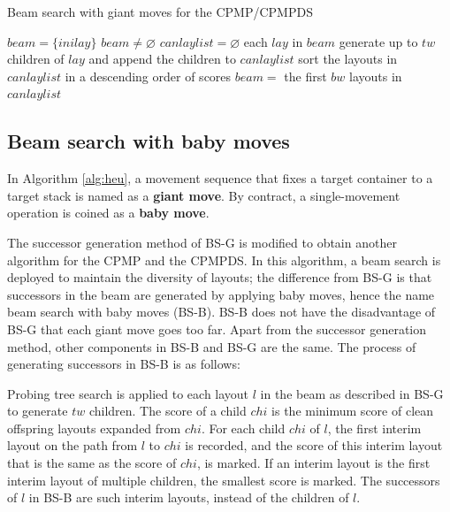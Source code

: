\documentclass[review,3p,times,authoryear,12pt]{elsarticle}
\begin{document}
\begin{algorithm*}[htbp]
	\caption{Beam search with giant moves for the CPMP/CPMPDS}
	\label{alg:bsg}
	\begin{codebox}
    \li $\mathit{beam} = \{\mathit{inilay}\}$
    \li \While $\mathit{beam} \neq \varnothing$
    \li \Do
        $\mathit{canlaylist}=\varnothing$
    \li \For each $\mathit{lay}$ in $\mathit{beam}$
    \li     \Do
             generate up to $\mathit{tw}$ children of $\mathit{lay}$ and append the children to $\mathit{canlaylist}$
             \End
    \li     sort the layouts in $\mathit{canlaylist}$ in a descending order of scores
    \li     $\mathit{beam} =$ the first $\mathit{bw}$ layouts in $\mathit{canlaylist}$
        \End
	\end{codebox}	
\end{algorithm*}

\subsection{Beam search with baby moves}

In Algorithm \ref{alg:heu}, a movement sequence that fixes a target container to a target stack is named as a \textbf{giant move}.
By contract, a single-movement operation is coined as a \textbf{baby move}.

The successor generation method of BS-G is modified to obtain another algorithm for the CPMP and the CPMPDS.
In this algorithm, a beam search is deployed to maintain the diversity of layouts; the difference from BS-G is that successors in the beam are generated by applying baby moves, hence the name beam search with baby moves (BS-B).
BS-B does not have the disadvantage of BS-G that each giant move goes too far.
Apart from the successor generation method, other components in BS-B and BS-G are the same.
The process of generating successors in BS-B is as follows:

Probing tree search is applied to each layout $l$ in the beam as described in BS-G to generate $\mathit{tw}$ children.
The score of a child $\mathit{chi}$ is the minimum score of clean offspring layouts expanded from $\mathit{chi}$.
For each child $\mathit{chi}$ of $l$, the first interim layout on the path from $l$ to $\mathit{chi}$ is recorded, and the score of this interim layout that is the same as the score of $\mathit{chi}$, is marked.
If an interim layout is the first interim layout of multiple children, the smallest score is marked.
The successors of $l$ in BS-B are such interim layouts, instead of the children of $l$.
\end{document}
